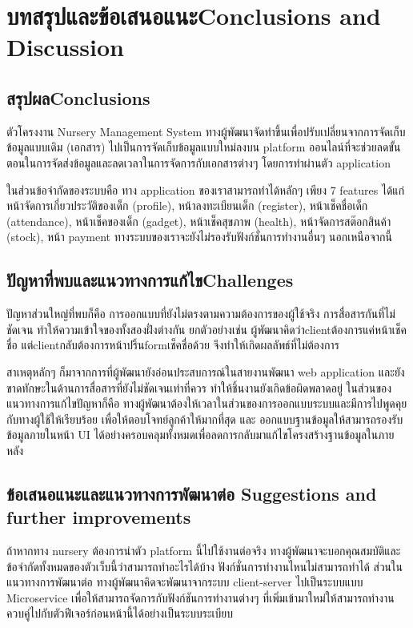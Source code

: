 \chapter{\ifcpe บทสรุปและข้อเสนอแนะ\else Conclusions and Discussion\fi}

\section{\ifcpe สรุปผล\else Conclusions\fi}

ตัวโครงงาน  Nursery Management System  ทางผู้พัฒนาจัดทำขึ้นเพื่อปรับเปลี่ยนจากการจัดเก็บข้อมูลแบบเดิม (เอกสาร) ไปเป็นการจัดเก็บข้อมูลแบบใหม่ลงบน platform ออนไลน์ที่จะช่วยลดขั้นตอนในการจัดส่งข้อมูลและลดเวลาในการจัดการกับเอกสารต่างๆ โดยการทำผ่านตัว application 

ในส่วนข้อจำกัดของระบบคือ ทาง application ของเราสามารถทำได้หลักๆ เพียง 7 features ได้แก่ หน้าจัดการเกี่ยวประวัติของเด็ก (profile), หน้าลงทะเบียนเด็ก (register), หน้าเช็คชื่อเด็ก (attendance), หน้าเช็คของเด็ก (gadget), หน้าเช็คสุขภาพ (health), หน้าจัดการสต๊อกสินค้า (stock), หน้า payment ทางระบบของเราจะยังไม่รองรับฟังก์ชั่นการทำงานอื่นๆ นอกเหนือจากนี้

\section{\ifcpe ปัญหาที่พบและแนวทางการแก้ไข\else Challenges\fi}

ปัญหาส่วนใหญ่ที่พบก็คือ การออกแบบที่ยังไม่ตรงตามความต้องการของผู้ใช้จริง  การสื่อสารกันที่ไม่ชัดเจน ทำให้ความเข้าใจของทั้งสองฝั่งต่างกัน ยกตัวอย่างเช่น ผู้พัฒนาคิดว่าclientต้องการแค่หน้าเช็คชื่อ แต่clientกลับต้องการหน้าปริ้นformเช็คชื่อด้วย จึงทำให้เกิดผลลัพธ์ที่ไม่ต้องการ  

สาเหตุหลักๆ ก็มาจากการที่ผู้พัฒนายังอ่อนประสบการณ์ในสายงานพัฒนา web application และยังขาดทักษะในด้านการสื่อสารที่ยังไม่ชัดเจนเท่าที่ควร ทำให้ชิ้นงานยังเกิดข้อผิดพลาดอยู่
ในส่วนของแนวทางการแก้ไขปัญหาก็คือ ทางผู้พัฒนาต้องให้เวลาในส่วนของการออกแบบระบบและมีการไปพูดคุยกับทางผู้ใช้ให้เรียบร้อย เพื่อให้ตอบโจทย์ลูกค้าให้มากที่สุด และ ออกแบบฐานข้อมูลให้สามารถรองรับข้อมูลภายในหน้า UI ได้อย่างครอบคลุมทั้งหมดเพื่อลดการกลับมาแก้ไขโครงสร้างฐานข้อมูลในภายหลัง
\section{\ifcpe%
ข้อเสนอแนะและแนวทางการพัฒนาต่อ
\else%
Suggestions and further improvements
\fi
}

ถ้าหากทาง nursery ต้องการนำตัว platform นี้ไปใช้งานต่อจริง ทางผู้พัฒนาจะบอกคุณสมบัติและข้อจำกัดทั้งหมดของตัวเว็บนี้ว่าสามารถทำอะไรได้บ้าง ฟังก์ชั่นการทำงานไหนไม่สามารถทำได้
ส่วนในแนวทางการพัฒนาต่อ  ทางผู้พัฒนาคิดจะพัฒนาจากระบบ client-server ไปเป็นระบบแบบ Microservice เพื่อให้สามารถจัดการกับฟังก์ชันการทำงานต่างๆ ที่เพิ่มเข้ามาใหม่ให้สามารถทำงานควบคู่ไปกับตัวฟีเจอร์ก่อนหน้านี้ได้อย่างเป็นระบบระเบียบ
